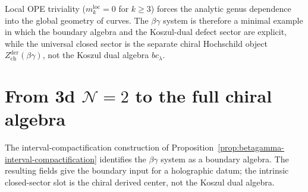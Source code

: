 \begin{remark}
\label{rem:betagamma-holographic-atom}
Local OPE triviality ($m_k^{\mathrm{loc}} = 0$ for $k \ge 3$) forces
the analytic genus dependence into the global geometry of curves. The
$\beta\gamma$ system is therefore a minimal example in which the
boundary algebra and the Koszul-dual defect sector are explicit, while
the universal closed sector is the separate chiral Hochschild object
$Z^{\mathrm{der}}_{\mathrm{ch}}(\beta\gamma)$, not the Koszul dual
algebra $bc_\lambda$.
\end{remark}

\section{From 3d \texorpdfstring{$\mathcal{N}=2$}{N=2} to the full chiral algebra}

The interval-compactification construction of
Proposition~\ref{prop:betagamma-interval-compactification} identifies the
$\beta\gamma$ system as a boundary algebra. The resulting fields give
the boundary input for a holographic datum; the intrinsic closed-sector slot is
the chiral derived center, not the Koszul dual algebra.

